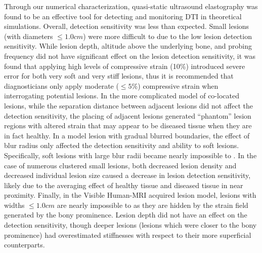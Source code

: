 		Through our numerical characterization, quasi-static ultrasound elastography was found to be an effective tool for detecting and monitoring DTI in theoretical simulations. Overall, detection sensitivity was less than expected. Small lesions (with diameters $\leq \unit{1.0}{cm}$) were more difficult to  due to the low lesion detection sensitivity. While lesion depth, altitude above the underlying bone, and probing frequency did not have significant effect on the lesion detection sensitivity, it was found that applying high levels of compressive strain (\unit{10}{\%}) introduced severe error for both very soft and very stiff lesions, thus it is recommended that diagnosticians only apply moderate ($\leq \unit{5}{\%}$) compressive strain when interrogating potential lesions. In the more complicated model of co-located lesions, while the separation distance between adjacent lesions did not affect the detection sensitivity, the placing of adjacent lesions generated ``phantom'' lesion regions with altered strain that may appear to be diseased tissue when they are in fact healthy. In a model lesion with gradual blurred boundaries, the effect of blur radius only affected the detection sensitivity and ability to  soft lesions. Specifically, soft lesions with large blur radii became nearly impossible to . In the case of numerous clustered small lesions, both decreased lesion density and decreased individual lesion size caused a decrease in lesion detection sensitivity, likely due to the averaging effect of healthy tissue and diseased tissue in near proximity. Finally, in the Visible Human-MRI acquired lesion model, lesions with widths $\leq \unit{1.0}{cm}$ are nearly impossible to  as they are hidden by the strain field generated by the bony prominence. Lesion depth did not have an effect on the detection sensitivity, though deeper lesions (lesions which were closer to the bony prominence) had overestimated stiffnesses with respect to their more superficial counterparts.

